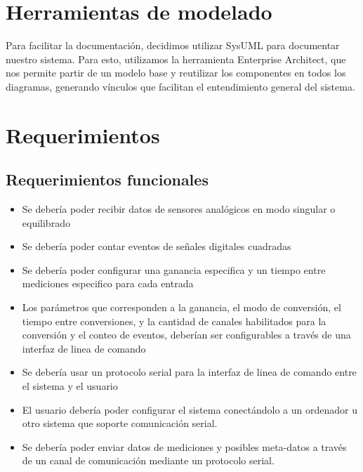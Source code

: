 \section{Herramientas de modelado} %
\label{sec:herramientas_de_modelado}

Para facilitar la documentación, decidimos utilizar SysUML para documentar nuestro sistema. Para esto, utilizamos la herramienta Enterprise Architect, que nos permite partir de un modelo base y reutilizar los componentes en todos los diagramas, generando vínculos que facilitan el entendimiento general del sistema.


\section{Requerimientos} %
\label{sec:requerimientos}

\subsection{Requerimientos funcionales} %
\label{sub:requerimientos_funcionales}

\begin{itemize}
	\item Se debería poder recibir datos de sensores analógicos en modo singular o equilibrado
	\item Se debería poder contar eventos de señales digitales cuadradas
	\item Se debería poder configurar una ganancia especifica y un tiempo entre mediciones especifico para cada entrada
	\item Los parámetros que corresponden a la ganancia, el modo de conversión, el tiempo entre conversiones, y la cantidad de canales habilitados para la conversión y el conteo de eventos, deberían ser configurables a través de una interfaz de linea de comando
	\item Se debería usar un protocolo serial para la interfaz de linea de comando entre el sistema y el usuario
	\item El usuario debería poder configurar el sistema conectándolo a un ordenador u otro sistema que soporte comunicación serial.
	\item Se debería poder enviar datos de mediciones y posibles meta-datos a través de un canal de comunicación mediante un protocolo serial.
\end{itemize}

